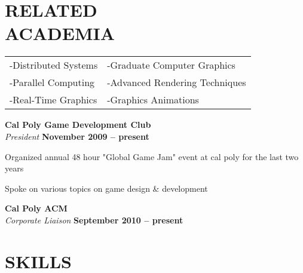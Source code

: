 \documentclass[margin,line]{resume}
\begin{document}
\begin{resume}
\sectionline

    \section{\mysidestyle \textbf{\large{R}\small{ELATED\\ACADEMIA}}} 

	\vspace{1mm} %
	\begin{tabular}{@{}p{6cm}p{6cm}}
	-Distributed Systems     &  -Graduate Computer Graphics   \\
	-Parallel Computing      &  -Advanced Rendering Techniques    \\
	-Real-Time Graphics      &  -Graphics Animations                   \\
	\end{tabular}

	\textbf{\listing Cal Poly Game Development Club}\\\vspace{1mm}%
	\textsl{President}\hfill \textbf{ November 2009 -- present}\vspace{-3mm}\\\vspace{-1mm}%
    \begin{list2}
    	\item Organized annual 48 hour "Global Game Jam" event at cal poly for the last two years
        \item Spoke on various topics on game design \& development
    \end{list2}\vspace{-1.5mm}

	\textbf{\listing Cal Poly ACM}\\\vspace{1mm}%
	\textsl{Corporate Liaison} \hfill \textbf{ September 2010 -- present}\vspace{-3mm}\\\vspace{-1mm}%


\sectionline

    \section{\mysidestyle \textbf{\large{S}\small{KILLS}}}


\end{resume}
\end{document}

